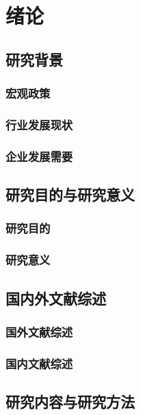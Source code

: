 

\chapter{绪论}
\section{研究背景}
\subsection{宏观政策}
\subsection{行业发展现状}
\subsection{企业发展需要}
\section{研究目的与研究意义}
\subsection{研究目的}
\subsection{研究意义}
\section{国内外文献综述}
\subsection{国外文献综述}
\subsection{国内文献综述}
\section{研究内容与研究方法}
